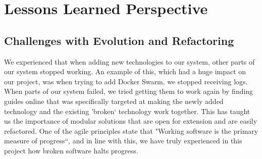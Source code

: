 \section{Lessons Learned Perspective}






\subsection{Challenges with Evolution and Refactoring}

We experienced that when adding new technologies to our system, other parts of our system stopped working. 
An example of this, which had a huge impact on our project, was when trying to add Docker Swarm, we stopped receiving logs. 
When parts of our system failed, we tried getting them to work again by finding guides online that was specifically targeted at making the newly added technology and the existing 'broken` technology work together. 
This has taught us the importance of modular solutions that are open for extension and are easily refactored. 
One of the agile principles state that "Working software is the primary measure of progress``, and in line with this, we have truly experienced in this project how broken software halts progress. 




